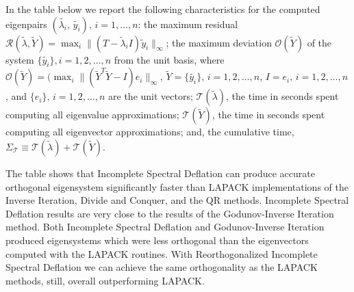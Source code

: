 \documentclass{report}
\begin{document}
In the table below we report the following characteristics for
the computed eigenpairs
$(\tilde{\lambda_i},\,\tilde{y_i}),\,i=1,\ldots, n$: the maximum
residual $\mathcal{R}(\tilde{\lambda}, \tilde{Y}) = \max_i \| (T
- \tilde{\lambda}_i I) \tilde{y}_i \|_\infty$; the maximum
deviation $\mathcal{O}(\tilde{Y})$ of the system
$\{\tilde{y_i}\}, i = 1, 2, \ldots, n$ from the unit basis, where
$\mathcal{O}(\tilde{Y})=(\max_i \|(\tilde{Y}^T \tilde{Y} - I)
e_i\|_\infty$, $\tilde{Y} = \{\tilde{y_i}\},\, i = 1, 2, \ldots,
n$, $I = {e_i},\, i = 1, 2, \ldots, n$, and $\{e_i\},\, i = 1, 2,
\ldots, n$ are the unit vectors; $\mathcal{T}( \tilde{\lambda})$,
the time in seconds spent computing all eigenvalue
approximations; $\mathcal{T}( \tilde{Y})$, the time in seconds
spent computing all eigenvector approximations; and, the
cumulative time, $\Sigma_{\mathcal{T}} \equiv
\mathcal{T}(\tilde{\lambda}) + \mathcal{T}( \tilde{Y})$.



\begin{table}[hbtp]
\centering
{}
\label{tbl:TestNew}
\end{table}


The table shows that Incomplete Spectral Deflation can produce
accurate orthogonal eigensystem significantly faster than LAPACK
implementations of the Inverse Iteration, Divide and Conquer, and
the QR methods. Incomplete Spectral Deflation results are very
close to the results of the Godunov-Inverse Iteration
method. Both Incomplete Spectral Deflation and Godunov-Inverse
Iteration produced eigensystems which were less orthogonal than
the eigenvectors computed with the LAPACK routines. With
Reorthogonalized Incomplete Spectral Deflation we can achieve the
same orthogonality as the LAPACK methods, still, overall
outperforming LAPACK.
\end{document}

